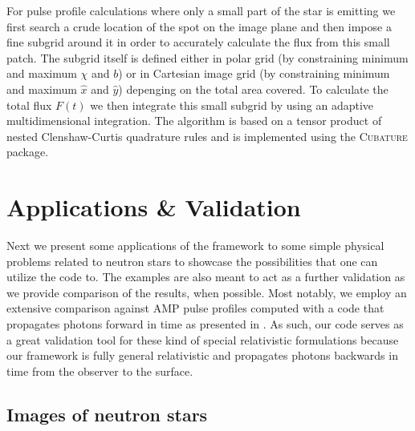 \documentclass[iop, usenatbib]{emulateapj}
\begin{document}
For pulse profile calculations where only a small part of the star is
emitting we first search a crude location of the spot on the image plane
and then impose a fine subgrid around it in order to accurately
calculate the flux from this small patch.  The subgrid itself is defined
either in polar grid (by constraining minimum and maximum $\chi$ and
$b$) or in Cartesian image grid (by constraining minimum and maximum
$\hat{x}$ and $\hat{y}$) depenging on the total area covered.  To
calculate the total flux $F(t)$ we then integrate this small subgrid by
using an adaptive multidimensional integration.  The algorithm is based
on a tensor product of nested Clenshaw-Curtis quadrature rules and is
implemented using the \textsc{Cubature} package.




\section{Applications \& Validation}

Next we present some applications of the framework to some simple physical problems related to neutron stars to showcase the possibilities that one can utilize the code to.
The examples are also meant to act as a further validation as we provide comparison of the results, when possible.
Most notably, we employ an extensive comparison against AMP pulse profiles computed with a code that propagates photons forward in time as presented in \citealt{PB06}.
As such, our code serves as a great validation tool for these kind of special relativistic formulations because our framework is fully general relativistic and propagates photons backwards in time from the observer to the surface.



\subsection{Images of neutron stars}
\end{document}
